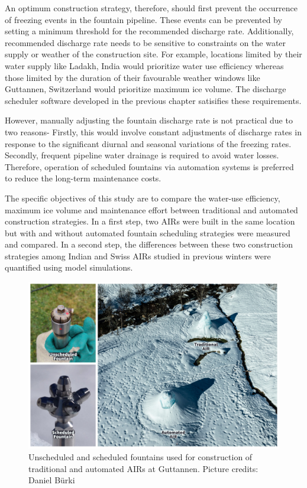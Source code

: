 An optimum construction strategy, therefore, should first prevent the occurrence of freezing events in the
fountain pipeline. These events can be prevented by setting a minimum threshold for the recommended discharge
rate. Additionally, recommended discharge rate needs to be sensitive to constraints on the water supply or
weather of the construction site. For example, locations limited by their water supply like Ladakh, India
would prioritize water use efficiency whereas those limited by the duration of their favourable weather windows
like Guttannen, Switzerland would prioritize maximum ice volume. The discharge scheduler software developed in
the previous chapter satisifies these requirements.

However, manually adjusting the fountain discharge rate is not practical due to two reasons- Firstly, this would
involve constant adjustments of discharge rates in response to the significant diurnal and seasonal variations
of the freezing rates. Secondly, frequent pipeline water drainage is required to avoid water losses. Therefore,
operation of scheduled fountains via automation systems is preferred to reduce the long-term maintenance costs.

The specific objectives of this study are to compare the water-use efficiency, maximum ice volume and
maintenance effort between traditional and automated construction strategies. In a first step, two AIRs were
built in the same location but with and without automated fountain scheduling strategies were measured and
compared. In a second step, the differences between these two construction strategies among Indian and Swiss
AIRs studied in previous winters were quantified using model simulations. 

\begin{figure}[htb]
\includegraphics[width=12cm]{figs/AIR_fountains.jpg}
\caption{Unscheduled and scheduled fountains used for construction of traditional and automated AIRs at Guttannen. Picture credits: Daniel Bürki}
\label{fig:2AIR}
\end{figure}

